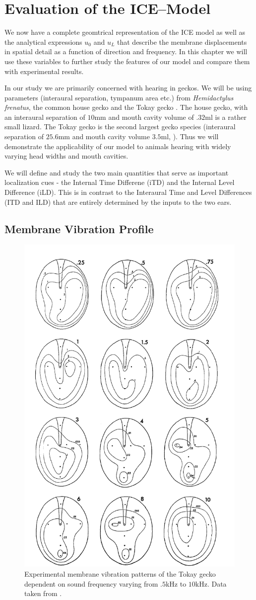 \chapter{Evaluation of the ICE--Model}\label{modelanalysis}
We now have a complete geomtrical representation of the ICE model as well as
 the analytical expressions $u_0$ and $u_L$ that describe the membrane displacements
in spatial detail as a function of direction and frequency. In this chapter we will use these variables
to further study the features of our model and compare them with experimental results.

In our study we are primarily concerned with hearing in geckos. We will be using
parameters (interaural separation, tympanum area etc.) from \textit{Hemidactylus frenatus}, the common house gecko
\cite{dalsgaardmanley2}
and the Tokay gecko \cite{dalsgaardtangcarr}. The house gecko, with an interaural separation of $10$mm and mouth cavity volume of $.32$ml is a rather
small lizard. The Tokay gecko is the second largest gecko species (interaural separation of $25.6$mm and mouth cavity volume $3.5$ml, \cite{dalsgaardtangcarr}).
Thus we will demonstrate the applicability of our model to animals hearing with widely varying head widths and mouth cavities. 

We will define and study the two main quantities that serve as important localization
cues - the Internal Time Differene (iTD) and the Internal Level Difference (iLD). This
is in contrast to the Interaural Time and Level Differences (ITD and ILD) that are
entirely determined by the inputs to the two ears.
\section{Membrane Vibration Profile}
\begin{figure}[ht!]
 \centering
 \includegraphics[width=.5\linewidth]{Diagrams/manleygeckoear2.png}
 \caption[Tokay gecko tympanum vibration profiles.]{Experimental membrane vibration patterns of the Tokay gecko dependent
 on sound frequency varying from $.5$kHz to $10$kHz. Data taken from \cite{manleygecko1}.}
  \label{manleygeckotympanum}
\end{figure}

